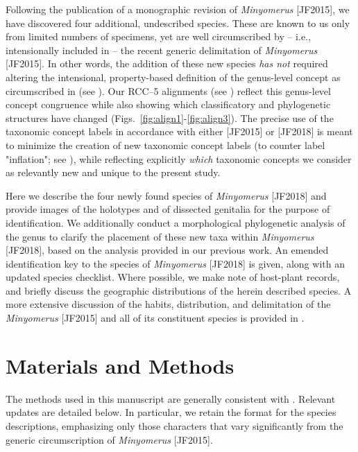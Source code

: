 \documentclass[fleqn,10pt,lineno]{wlpeerj} %
\begin{document}
	Following the publication of a monographic revision of \textit{Minyomerus} [JF2015], we have discovered four additional, undescribed species. These are known to us only from limited numbers of specimens, yet are well circumscribed by -- i.e., intensionally included in \citep{fp2009} -- the recent generic delimitation of \textit{Minyomerus} [JF2015].
	In other words, the addition of these new species \emph{has not} required altering the intensional, property-based definition of the genus-level concept as circumscribed in \citet{jansen2015} (see \textbf{}). Our RCC--5 alignments (see \textbf{}) reflect this genus-level concept congruence while also showing which classificatory and phylogenetic structures have changed (Figs.~\ref{fig:align1}-\ref{fig:align3}).
	The precise use of the taxonomic concept labels in accordance with either [JF2015] or [JF2018] is meant to minimize the creation of new taxonomic concept labels (to counter label "inflation"; see \citet{fp2009}), while reflecting explicitly \emph{which} taxonomic concepts we consider as relevantly new and unique to the present study.
	
	Here we describe the four newly found species of \textit{Minyomerus} [JF2018] and provide images of the holotypes and of dissected genitalia for the purpose of identification.
	We additionally conduct a morphological phylogenetic analysis of the genus to clarify the placement of these new taxa within \textit{Minyomerus} [JF2018], based on the analysis provided in our previous work.
	An emended identification key to the species of \textit{Minyomerus} [JF2018] is given, along with an updated species checklist.
	Where possible, we make note of host-plant records, and briefly discuss the geographic distributions of the herein described species.
	A more extensive discussion of the habits, distribution, and delimitation of the \textit{Minyomerus} [JF2015] and all of its constituent species is provided in \citep{jansen2015}.
	
\section*{Materials and Methods}\label{sec:methods} 
	The methods used in this manuscript are generally consistent with \citet{jansen2015}. Relevant updates are detailed below. 
	In particular, we retain the format for the species descriptions, emphasizing only those characters that vary significantly from the generic circumscription of \textit{Minyomerus} [JF2015].
\end{document}
